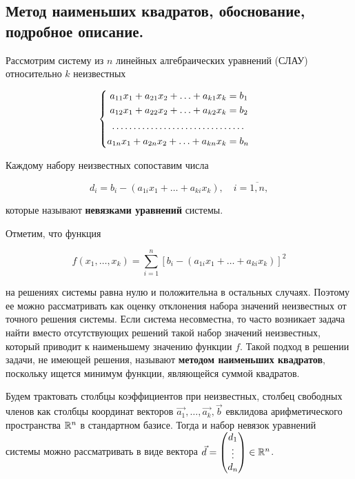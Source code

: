 \subsection{
    Метод наименьших квадратов, обоснование, подробное описание.
}

Рассмотрим систему из $n$ линейных алгебраических уравнений (СЛАУ) относительно $k$ неизвестных

\begin{equation}
    \begin{cases}
        \begin{aligned}
            a_{11} x_1 + a_{21} x_2 + \ldots + a_{k1} x_k &= b_1 \\
            a_{12} x_1 + a_{22} x_2 + \ldots + a_{k2} x_k &= b_2 \\
            \hdotsfor{2} \\
            a_{1n} x_1 + a_{2n} x_2 + \ldots + a_{kn} x_k &= b_n \\
        \end{aligned}
    \end{cases}
    \label{eq:slau_14_1}
\end{equation}

Каждому набору неизвестных сопоставим числа

$$d_i = b_i - (a_{1i}x_1 + \ldots + a_{ki}x_k), \quad i = \overline{1, n},$$

которые называют \textbf{невязками уравнений} системы.

Отметим, что функция 

$$f(x_1, \ldots, x_k) = \sum_{i=1}^{n} [b_i - (a_{1i}x_1 + \ldots + a_{ki}x_k)]^2$$

на решениях системы равна нулю и положительна в остальных случаях. Поэтому ее можно рассматривать как оценку отклонения набора значений неизвестных от точного решения системы. Если система несовместна, то часто возникает задача найти вместо отсутствующих решений такой набор значений неизвестных, который приводит к наименьшему значению функции $f$. Такой подход в решении задачи, не имеющей решения, называют \textbf{методом наименьших квадратов}, поскольку ищется минимум функции, являющейся суммой квадратов.

Будем трактовать столбцы коэффициентов при неизвестных, столбец свободных членов как столбцы координат векторов $\vec{a_1}, \ldots, \vec{a_k}, \vec{b}$ евклидова арифметического пространства $\mathbb{R}^n$ в стандартном базисе. Тогда и набор невязок уравнений системы можно рассматривать в виде вектора $\vec{d} = \begin{pmatrix} d_1 \\ \vdots \\ d_n \end{pmatrix} \in \mathbb{R}^n$.

